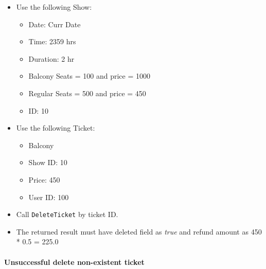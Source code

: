 \documentclass[]{article}
\providecommand{\tightlist}{%
  \setlength{\itemsep}{0pt}\setlength{\parskip}{0pt}}
\let\oldparagraph\paragraph
\renewcommand{\paragraph}[1]{\oldparagraph{#1}\mbox{}}
\begin{document}
\begin{itemize}
\tightlist
\item
  Use the following Show:

  \begin{itemize}
  \tightlist
  \item
    Date: Curr Date
  \item
    Time: 2359 hrs
  \item
    Duration: 2 hr
  \item
    Balcony Seats = 100 and price = 1000
  \item
    Regular Seats = 500 and price = 450
  \item
    ID: 10
  \end{itemize}
\item
  Use the following Ticket:

  \begin{itemize}
  \tightlist
  \item
    Balcony
  \item
    Show ID: 10
  \item
    Price: 450
  \item
    User ID: 100
  \end{itemize}
\item
  Call \texttt{DeleteTicket} by ticket ID.
\item
  The returned result must have deleted field as \emph{true} and refund
  amount as 450 * 0.5 = 225.0
\end{itemize}

\hypertarget{unsuccessful-delete-non-existent-ticket}{%
\paragraph{Unsuccessful delete non-existent
ticket}\label{unsuccessful-delete-non-existent-ticket}}
\end{document}
